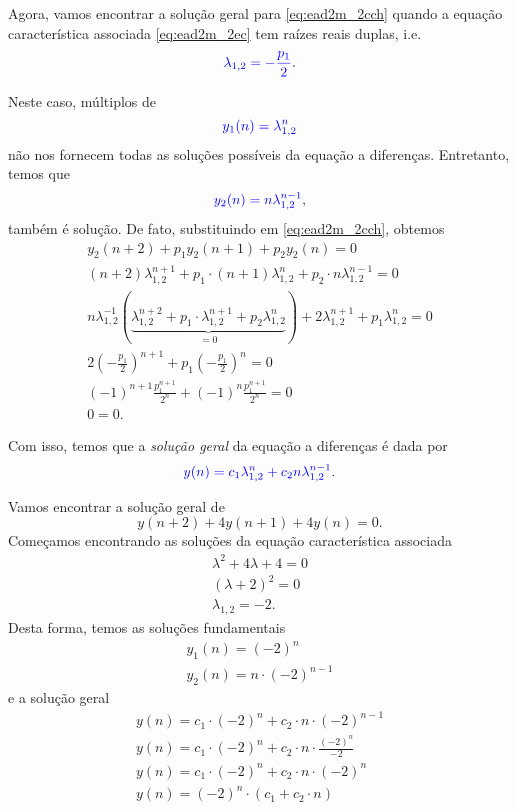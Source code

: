 Agora, vamos encontrar a solução geral para \eqref{eq:ead2m_2cch} quando a equação característica associada \eqref{eq:ead2m_2ec} tem raízes reais duplas, i.e.
\begin{equation}
  {\color{blue}\lambda_{1,2} = -\frac{p_1}{2}}.
\end{equation}

Neste caso, múltiplos de
\begin{equation}
  {\color{blue}y_1(n) = \lambda^n_{1,2}}
\end{equation}
não nos fornecem todas as soluções possíveis da equação a diferenças. Entretanto, temos que
\begin{equation}
  {\color{blue}y_2(n) = n\lambda_{1,2}^{n-1}},
\end{equation}
também é solução. De fato, substituindo em \eqref{eq:ead2m_2cch}, obtemos
\begin{gather}
  y_2(n+2) + p_1y_2(n+1) + p_2y_2(n) = 0\\
  (n+2)\lambda_{1,2}^{n+1} + p_1\cdot(n+1)\lambda_{1,2}^n + p_2\cdot n\lambda_{1,2}^{n-1} = 0\\
  n\lambda_{1,2}^{-1}\left(\underbrace{\lambda_{1,2}^{n+2}+p_1\cdot\lambda_{1,2}^{n+1}+p_2\lambda_{1,2}^n}_{=0}\right) + 2\lambda_{1,2}^{n+1}+p_1\lambda_{1,2}^n = 0\\
  2\left(-\frac{p_1}{2}\right)^{n+1}+p_1\left(-\frac{p_1}{2}\right)^n = 0\\
  (-1)^{n+1}\frac{p_1^{n+1}}{2^n} + (-1)^n\frac{p_1^{n+1}}{2^n} = 0\\
  0 = 0.
\end{gather}

Com isso, temos que a \emph{solução geral} da equação a diferenças é dada por
\begin{equation}
  {\color{blue}y(n) = c_1\lambda_{1,2}^n + c_2n\lambda_{1,2}^{n-1}}.
\end{equation}

\begin{ex}
  Vamos encontrar a solução geral de
  \begin{equation}
    y(n+2)+4y(n+1)+4y(n)=0.
  \end{equation}
  Começamos encontrando as soluções da equação característica associada
  \begin{gather}
    \lambda^2 + 4\lambda + 4 = 0\\
    (\lambda+2)^2 = 0 \\
    \lambda_{1,2} = -2.
  \end{gather}
  Desta forma, temos as soluções fundamentais
  \begin{gather}
    y_1(n) = (-2)^n\\
    y_2(n) = n\cdot (-2)^{n-1}
  \end{gather}
  e a solução geral
  \begin{gather}
    y(n) = c_1\cdot (-2)^n + c_2\cdot n\cdot (-2)^{n-1}\\
    y(n) = c_1\cdot (-2)^n + c_2\cdot n\cdot \frac{(-2)^n}{-2}\\
    y(n) = c_1\cdot(-2)^n + c_2\cdot n \cdot (-2)^n\\
    y(n) = (-2)^n\cdot \left(c_1 + c_2\cdot n\right)
  \end{gather}
\end{ex}

